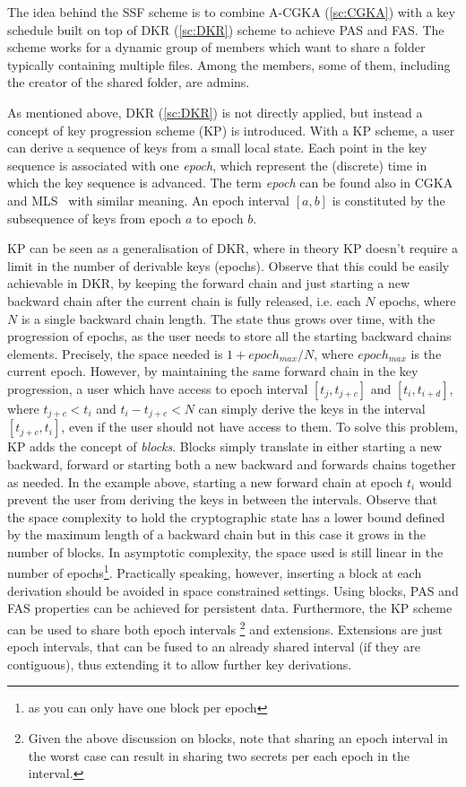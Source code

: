 The idea behind the SSF scheme is to combine A-CGKA (\cref{sc:CGKA}) with
a key schedule built on top of DKR (\cref{sc:DKR}) scheme 
to achieve PAS and FAS.
The scheme works for a dynamic group of members which want to share a folder
typically containing multiple files. Among the members, some of them,
including the creator of the shared folder, are admins.

As mentioned above, DKR (\cref{sc:DKR}) is not directly applied, 
but instead a concept of key progression scheme (KP) is introduced.
With a KP scheme, a user can derive a sequence of keys from a small local state. 
Each point in the key sequence is associated with one \textit{epoch}, 
which represent the (discrete) time in which the key sequence is advanced.
The term \textit{epoch} can be found also in CGKA and MLS~\cite{rfc9420} with similar meaning.
An epoch interval $[a, b]$ is constituted by the subsequence of keys
from epoch $a$ to epoch $b$.

KP can be seen as a generalisation of DKR, where in theory KP doesn't require
a limit in the number of derivable keys (epochs).
Observe that this could be easily achievable in DKR, by keeping the forward chain
and just starting a new backward chain after the current chain is fully released,
i.e. each $N$ epochs, where $N$ is a single backward chain length.
The state thus grows over time, with the progression of epochs, as the user needs to store
all the starting backward chains elements. Precisely, the space needed
is $1 + epoch_{max} / N$, where $epoch_{max}$ is the current epoch.
However, by maintaining the same forward chain in the key progression,
a user which have access to epoch interval 
$[t_j, t_{j + c}]$ and $[t_i, t_{i + d}]$, 
where $t_{j + c} < t_i$ and $t_i - t_{j + c} < N$  
can simply derive the keys in the interval $[t_{j + c}, t_i]$, even if 
the user should not have access to them.
To solve this problem, KP adds the concept of \textit{blocks}.
Blocks simply translate in either starting a new backward, forward or 
starting both a new backward and forwards chains together as needed. 
In the example above, starting a new forward chain
at epoch $t_i$ would prevent the user from deriving the keys in between 
the intervals. Observe that the space complexity to hold the cryptographic
state has a lower bound defined by the maximum length of a backward chain
but in this case it grows in the number of blocks. In asymptotic
complexity, the space used is still linear in the number of epochs\footnote{as you can only have one block per epoch}.
Practically speaking, however, inserting a block at each derivation
should be avoided in space constrained settings. 
Using blocks, PAS and FAS properties can be achieved for persistent data.
Furthermore, the KP scheme can be used to share both epoch intervals
\footnote{Given the above discussion on blocks, note that sharing an epoch interval in the worst case can result in sharing two secrets per each epoch in the interval.}
and extensions. Extensions are just epoch intervals, that can be fused 
to an already shared interval (if they are contiguous), thus extending it to
allow further key derivations.

